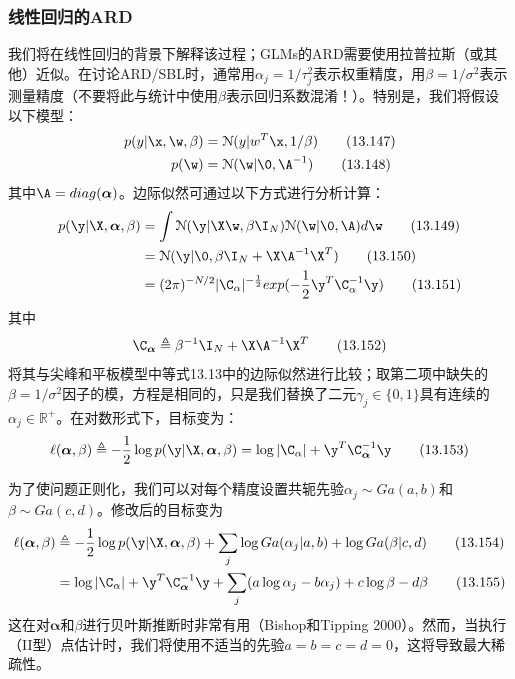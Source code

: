 \documentclass[a4paper]{article}
\begin{document}
\subsubsection{线性回归的ARD}
我们将在线性回归的背景下解释该过程；GLMs的ARD需要使用拉普拉斯（或其他）近似。在讨论ARD/SBL时，通常用$\alpha_j=1/\tau_j^2$表示权重精度，用$\beta=1/\sigma^2$表示测量精度（不要将此与统计中使用$\beta$表示回归系数混淆！）。特别是，我们将假设以下模型：
\begin{align}
	p(y|\x,\w,\beta)&=\mathcal{N}(y|w^T\x,1/\beta)\tag{13.147}\\
	p(\w)&=\mathcal{N}(\w|\0,\A^{-1})\tag{13.148}
\end{align}
其中$\A=diag(\boldsymbol{\alpha})$。边际似然可通过以下方式进行分析计算：
\begin{align}
	p(\y|\X,\boldsymbol{\alpha},\beta)&=\int \mathcal{N}(\y|\X\w,\beta\I_N)\mathcal{N}(\w|\0,\A)d\w\tag{13.149}\\
	&=\mathcal{N}(\y|\0,\beta\I_N+\X\A^{-1}\X^T)\tag{13.150}\\
	&=(2\pi)^{-N/2}|\C_\alpha|^{-\frac{1}{2}}exp(-\frac{1}{2}\y^T\C_\alpha^{-1}\y)\tag{13.151}
\end{align}
其中
\begin{equation}
	\C_{\boldsymbol{\alpha}}\triangleq \beta^{-1}\I_N+\X\A^{-1}\X^T\tag{13.152}
\end{equation}
将其与尖峰和平板模型中等式13.13中的边际似然进行比较；取第二项中缺失的$\beta=1/\sigma^2$因子的模，方程是相同的，只是我们替换了二元$\gamma_j\in \{0,1\}$具有连续的$\alpha_j\in \mathbb{R}^+$。在对数形式下，目标变为：
\begin{equation}
	\ell(\boldsymbol{\alpha},\beta)\triangleq -\frac{1}{2}\log p(\y|\X,\boldsymbol{\alpha},\beta)=\log |\C_\alpha|+\y^T\C_{\boldsymbol{\alpha}}^{-1}\y\tag{13.153}
\end{equation}

为了使问题正则化，我们可以对每个精度设置共轭先验$\alpha_j\sim Ga(a,b)$和$\beta \sim Ga(c,d)$。修改后的目标变为
\begin{align}
	\ell(\boldsymbol{\alpha},\beta)&\triangleq -\frac{1}{2}\log p(\y|\X,\boldsymbol{\alpha},\beta)+\sum_{j}\log Ga(\alpha_j|a,b)+\log Ga(\beta|c,d)\tag{13.154}\\
	&=\log |\C_\alpha|+\y^T\C_{\boldsymbol{\alpha}}^{-1}\y+\sum_{j}(a\log \alpha_j-b\alpha_j)+c\log \beta-d\beta\tag{13.155}
\end{align}
这在对$\boldsymbol{\alpha}$和$\beta$进行贝叶斯推断时非常有用（Bishop和Tipping 2000）。然而，当执行（II型）点估计时，我们将使用不适当的先验$a=b=c=d=0$，这将导致最大稀疏性。
\end{document}
